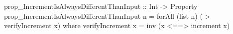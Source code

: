 \begin{haskellcode}
    prop_IncrementIsAlwaysDifferentThanInput :: Int -> Property
    prop_IncrementIsAlwaysDifferentThanInput n =
            forAll (list n) (\x -> verifyIncrement x)
        where verifyIncrement x = inv (x <==> increment x)
\end{haskellcode}
